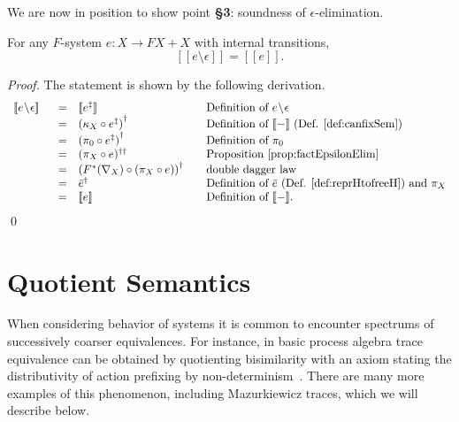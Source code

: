 \documentclass[oribibl,envcountsame,envcountsect,runningheads]{llncs}
\newcommand{\free}[1]{{#1^*}}
\renewcommand{\>}{\rangle}
\newcommand{\bb}[1]{[\![ #1 ]\!]}
\def\altsol#1{{#1}^\ddag}
\def\epselim#1{{#1}\!\setminus\! \epsilon}
\def\GF{F} \def\GFG{G} \def\MM{R} \def\quot{\xi} \def\quotG{\gamma}
\begin{document}
\noindent We are now in position to show point {\bf \S 3}: soundness of $\epsilon$-elimination.
\newcommand{\propEpsilonElimSound}{For any $\GF $-system $e : X \to \GF X + X$ with internal transitions,
\[\bb{\epselim{e}} = \bb{e}.\]
}
\begin{theorem} \label{th:epselimsound}
\propEpsilonElimSound
\end{theorem}
\begin{proof} The statement is shown by the following derivation.
\[
\begin{array}{lcl@{\qquad}l}
\bb{\epselim{e}}\ \ &= & \bb{ \altsol e} & \text{Definition of $\epselim{e}$}\\
    & = & \cansol {(\kappa_X \circ \altsol e)} & \text{Definition of $\bb{-}$ (Def. \ref{def:canfixSem})}\\
  & = &\cansol {(\pi_0 \circ \altsol e)} & \text{Definition of $\pi_0$} \\
& = & (\pi_{X} \circ e)^{\dagger\dagger} & \text{Proposition \ref{prop:factEpsilonElim}} \\
& = & \cansol {(\free{\GF }(\nabla_X) \circ (\pi_{X} \circ e))} & \text{double dagger law}\\& = &  \cansol {\bar{e}} & \text{Definition of $\bar{e}$ (Def. \ref{def:reprHtofreeH}) and $\pi_X$} \\
& = &  \bb{e} & \text{Definition of $\bb{-}$.}
\end{array}
\]
\qed
\end{proof}
\section{Quotient Semantics}\label{ssec:quot}
When considering behavior of systems it is common to encounter spectrums of successively coarser equivalences. For instance, in basic process algebra trace equivalence can be obtained by quotienting bisimilarity with an axiom stating the distributivity of action prefixing by non-determinism~\cite{Rabinovich93}. There are many more examples of this phenomenon, including Mazurkiewicz traces, which we will describe below.
\end{document}
